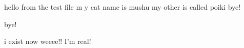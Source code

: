hello from the test file
m y cat name is mushu
my other is called poiki
bye!

bye!

i exist now weeee!!
I'm real! 

